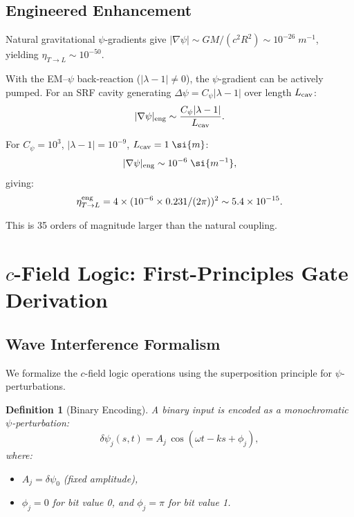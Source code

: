 \documentclass[aps,prd,twocolumn,superscriptaddress,nofootinbib,floatfix]{revtex4-2}
\newcommand{\ee}[1]{\times 10^{#1}}
\newtheorem{definition}[theorem]{Definition}
\begin{document}
\subsection{Engineered Enhancement}

Natural gravitational $\psi$-gradients give
$|\nabla\psi| \sim GM/(c^2 R^2) \sim 10^{-26}\;\si{m^{-1}}$,
yielding $\eta_{T\to L} \sim 10^{-50}$.

With the EM--$\psi$ back-reaction ($|\lambda-1| \neq 0$), the
$\psi$-gradient can be actively pumped.  For an SRF cavity
generating $\Delta\psi = C_\psi|\lambda-1|$ over length $L_{\rm cav}$:
\begin{equation}
|\nabla\psi|_{\rm eng} \sim \frac{C_\psi|\lambda-1|}{L_{\rm cav}}.
\end{equation}

For $C_\psi = 10^3$, $|\lambda-1| = 10^{-9}$, $L_{\rm cav} = 1\;\si{m}$:
\begin{equation}
|\nabla\psi|_{\rm eng} \sim 10^{-6}\;\si{m^{-1}},
\end{equation}
giving:
\begin{equation}
\eta_{T\to L}^{\rm eng} = 4 \times (10^{-6} \times 0.231/(2\pi))^2
\sim 5.4\ee{-15}.
\end{equation}

This is 35 orders of magnitude larger than the natural coupling.

\section{$c$-Field Logic: First-Principles Gate Derivation}
\label{sec:logic}

\subsection{Wave Interference Formalism}

We formalize the $c$-field logic operations using the
superposition principle for $\psi$-perturbations.

\begin{definition}[Binary Encoding]
A binary input is encoded as a monochromatic $\psi$-perturbation:
\begin{equation}
\delta\psi_j(s,t) = A_j\,\cos(\omega t - ks + \phi_j),
\end{equation}
where:
\begin{itemize}
\item $A_j = \delta\psi_0$ (fixed amplitude),
\item $\phi_j = 0$ for bit value 0, and $\phi_j = \pi$ for bit value 1.
\end{itemize}
\end{definition}
\end{document}
